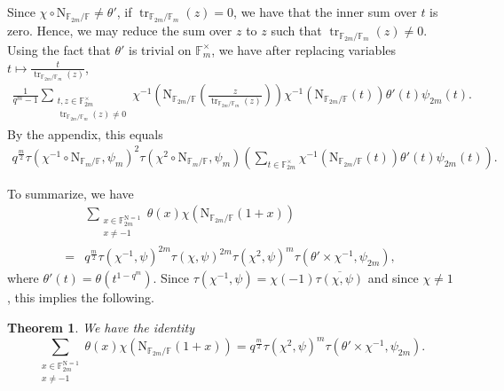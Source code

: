 \documentclass[12pt, reqno]{amsart}
\newtheorem{theorem}{Theorem}[section]
\theoremstyle{definition}
\theoremstyle{definition}
\theoremstyle{definition}
\newcommand{\multiplicativegroup}[1]{#1^{\times}}
\newcommand{\conjugate}[1]{\overline{#1}}
\newcommand{\fieldCharacter}{\psi}
\newcommand{\trace}{\operatorname{tr}}
\newcommand{\aFieldNorm}{\mathrm{N}}
\newcommand{\finiteField}{\mathbb{F}}
\newcommand{\finiteFieldExtension}[1]{\finiteField_{#1}}
\newcommand{\NormOneGroup}[1]{\finiteFieldExtension{#1}^{\aFieldNorm = 1}}
\begin{document}
Since $\chi \circ \aFieldNorm_{\finiteFieldExtension{2m} \slash \finiteField} \ne \theta'$, if $\trace_{\finiteFieldExtension{2m} \slash \finiteFieldExtension{m}}\left(z\right) = 0$, we have that the inner sum over $t$ is zero. Hence, we may reduce the sum over $z$ to $z$ such that $\trace_{\finiteFieldExtension{2m} \slash \finiteFieldExtension{m}}\left(z\right) \ne 0$. Using the fact that $\theta'$ is trivial on $\multiplicativegroup{\finiteFieldExtension{m}}$, we have after replacing variables $t \mapsto \frac{t}{\trace_{\finiteFieldExtension{2m} \slash \finiteFieldExtension{m}}\left(z\right)}$,
\begin{align*}
	\frac{1}{q^m-1}\sum_{\substack{t,z \in \multiplicativegroup{\finiteFieldExtension{2m}}\\
			\trace_{\finiteFieldExtension{2m} \slash \finiteFieldExtension{m}}\left(z\right) \ne 0}} \chi^{-1}\left(\aFieldNorm_{\finiteFieldExtension{2m} \slash \finiteField}\left(\frac{z}{\trace_{\finiteFieldExtension{2m} \slash \finiteFieldExtension{m}}\left(z\right) }\right)\right) \chi^{-1}\left(\aFieldNorm_{\finiteFieldExtension{2m} \slash \finiteField}\left(t\right)\right) \theta' \left(t\right) \fieldCharacter_{2m}\left(t\right).
\end{align*}
By the appendix, this equals
\begin{align*}
	q^{\frac{m}{2}} \tau\left(\chi^{-1} \circ \aFieldNorm_{\finiteFieldExtension{m} \slash \finiteField}, \fieldCharacter_m\right)^2 \tau\left(\chi^{2} \circ \aFieldNorm_{\finiteFieldExtension{m} \slash \finiteField}, \fieldCharacter_m\right) \left(\sum_{t \in \multiplicativegroup{\finiteFieldExtension{2m}}} \chi^{-1}\left(\aFieldNorm_{\finiteFieldExtension{2m} \slash \finiteField}\left(t\right)\right) \theta' \left(t\right) \fieldCharacter_{2m}\left(t\right)\right).
\end{align*}

To summarize, we have
\begin{align*}
	& \sum_{\substack{x \in \NormOneGroup{2m}\\
			x \ne -1}} \theta \left(x\right) \chi\left(\aFieldNorm_{\finiteFieldExtension{2m} \slash \finiteField}\left(1 + x\right)\right) \\
		=& q^{\frac{m}{2}} \tau\left(\chi^{-1}, \fieldCharacter\right)^{2m} \tau\left(\chi, \fieldCharacter\right)^{2m} \tau\left(\chi^{2}, \fieldCharacter\right)^m \tau\left(\theta' \times \chi^{-1}, \fieldCharacter_{2m}\right),
\end{align*}
where $\theta'\left(t\right) = \theta\left(t^{1-q^m}\right)$.
Since $\tau\left(\chi^{-1}, \fieldCharacter\right) = \chi\left(-1\right) \conjugate{\tau\left(\chi, \fieldCharacter\right)}$ and since $\chi \ne 1$, this implies the following. \begin{theorem}
	We have the identity $$\sum_{\substack{x \in \NormOneGroup{2m}\\
			x \ne -1}} \theta \left(x\right) \chi\left(\aFieldNorm_{\finiteFieldExtension{2m} \slash \finiteField}\left(1 + x\right)\right) = q^{\frac{m}{2}} \tau\left(\chi^{2}, \fieldCharacter\right)^m \tau\left(\theta' \times \chi^{-1}, \fieldCharacter_{2m}\right).$$
\end{theorem}
\end{document}
